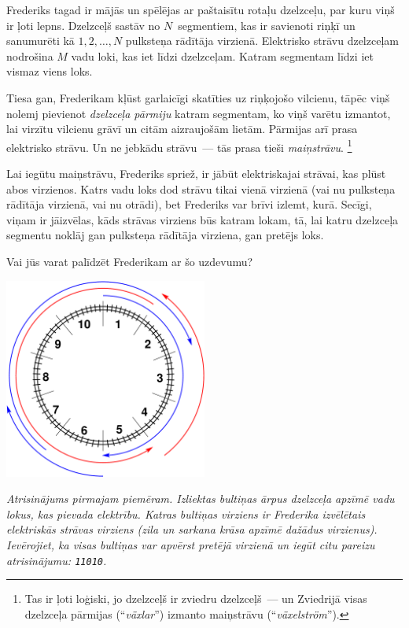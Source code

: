 \ifx\boi\undefined\fi
\def\version{jury-1}
Frederiks tagad ir mājās un spēlējas ar paštaisītu rotaļu dzelzceļu, par kuru viņš ir ļoti lepns.
Dzelzceļš sastāv no $N$~segmentiem, kas ir savienoti riņķī un sanumurēti kā $1, 2, \dots, N$ pulksteņa rādītāja virzienā.
Elektrisko strāvu dzelzceļam nodrošina $M$ vadu loki, kas iet līdzi dzelzceļam.
Katram segmentam līdzi iet vismaz viens loks.

Tiesa gan, Frederikam kļūst garlaicīgi skatīties uz riņķojošo vilcienu, tāpēc viņš nolemj pievienot \emph{dzelzceļa pārmiju}
katram segmentam, ko viņš varētu izmantot, lai virzītu vilcienu grāvī un citām aizraujošām lietām.
Pārmijas arī prasa elektrisko strāvu. Un ne jebkādu strāvu~--- tās prasa tieši \emph{maiņstrāvu}.%
\footnote{Tas ir ļoti loģiski, jo dzelzceļš ir zviedru dzelzceļš~--- un Zviedrijā visas dzelzceļa pārmijas
(``\emph{växlar}'') izmanto maiņstrāvu (``\emph{växelström}'').}

Lai iegūtu maiņstrāvu, Frederiks spriež, ir jābūt elektriskajai strāvai, kas plūst abos
virzienos. Katrs vadu loks dod strāvu tikai vienā virzienā (vai nu pulksteņa rādītāja virzienā,
vai nu otrādi), bet Frederiks var brīvi izlemt, kurā. Secīgi, viņam ir jāizvēlas,
kāds strāvas virziens būs katram lokam, tā, lai katru dzelzceļa segmentu noklāj gan pulksteņa
rādītāja virziena, gan pretējs loks.

Vai jūs varat palīdzēt Frederikam ar šo uzdevumu?

\vspace{2mm}
\begin{center}
\includegraphics[width=0.5\textwidth]{alternatingfig.pdf}
\end{center}
\vspace{1mm}
{\em Atrisinājums pirmajam piemēram. Izliektas bultiņas ārpus dzelzceļa apzīmē vadu lokus, kas pievada elektrību. Katras bultiņas virziens ir Frederika izvēlētais elektriskās strāvas virziens (zila un sarkana krāsa apzīmē dažādus virzienus). Ievērojiet, ka visas bultiņas var apvērst pretējā virzienā un iegūt citu pareizu atrisinājumu: \texttt{11010}.}

